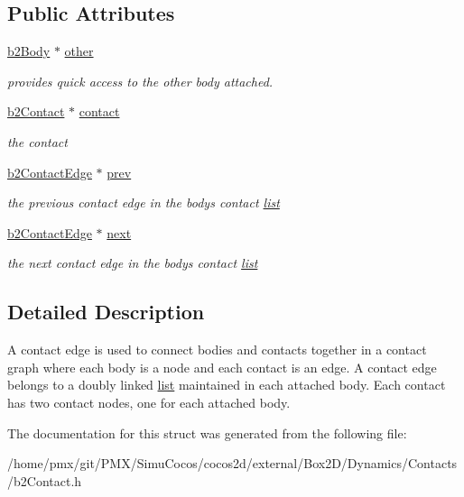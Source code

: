 \subsection*{Public Attributes}
\begin{DoxyCompactItemize}
\item 
\mbox{\label{structb2ContactEdge_a057c551f1080f2634433c90a2834a86b}} 
\hyperlink{classb2Body}{b2\+Body} $\ast$ \hyperlink{structb2ContactEdge_a057c551f1080f2634433c90a2834a86b}{other}
\begin{DoxyCompactList}\small\item\em provides quick access to the other body attached. \end{DoxyCompactList}\item 
\mbox{\label{structb2ContactEdge_a315584a437aabdb9d1049d8e2bc330dd}} 
\hyperlink{classb2Contact}{b2\+Contact} $\ast$ \hyperlink{structb2ContactEdge_a315584a437aabdb9d1049d8e2bc330dd}{contact}
\begin{DoxyCompactList}\small\item\em the contact \end{DoxyCompactList}\item 
\mbox{\label{structb2ContactEdge_a4b14b69526cdb31f19800ff6d58e0b26}} 
\hyperlink{structb2ContactEdge}{b2\+Contact\+Edge} $\ast$ \hyperlink{structb2ContactEdge_a4b14b69526cdb31f19800ff6d58e0b26}{prev}
\begin{DoxyCompactList}\small\item\em the previous contact edge in the body\textquotesingle{}s contact \hyperlink{protocollist-p}{list} \end{DoxyCompactList}\item 
\mbox{\label{structb2ContactEdge_ab390577f8b2848edaecca80f71c15a3b}} 
\hyperlink{structb2ContactEdge}{b2\+Contact\+Edge} $\ast$ \hyperlink{structb2ContactEdge_ab390577f8b2848edaecca80f71c15a3b}{next}
\begin{DoxyCompactList}\small\item\em the next contact edge in the body\textquotesingle{}s contact \hyperlink{protocollist-p}{list} \end{DoxyCompactList}\end{DoxyCompactItemize}


\subsection{Detailed Description}
A contact edge is used to connect bodies and contacts together in a contact graph where each body is a node and each contact is an edge. A contact edge belongs to a doubly linked \hyperlink{protocollist-p}{list} maintained in each attached body. Each contact has two contact nodes, one for each attached body. 

The documentation for this struct was generated from the following file\+:\begin{DoxyCompactItemize}
\item 
/home/pmx/git/\+P\+M\+X/\+Simu\+Cocos/cocos2d/external/\+Box2\+D/\+Dynamics/\+Contacts/b2\+Contact.\+h\end{DoxyCompactItemize}
